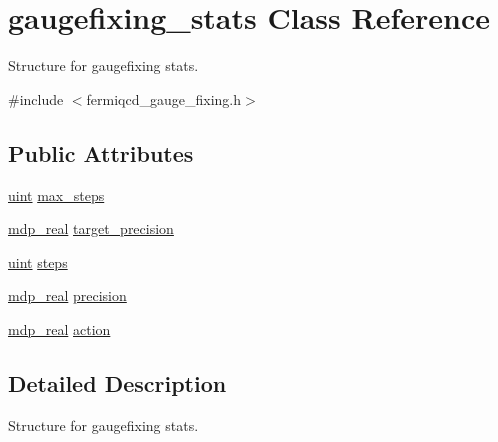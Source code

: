 \hypertarget{classgaugefixing__stats}{
\section{gaugefixing\_\-stats Class Reference}
\label{classgaugefixing__stats}
}


Structure for gaugefixing stats.  


{\ttfamily \#include $<$fermiqcd\_\-gauge\_\-fixing.h$>$}\subsection*{Public Attributes}
\begin{DoxyCompactItemize}
\item 
\hyperlink{mdp__global__vars_8h_a91ad9478d81a7aaf2593e8d9c3d06a14}{uint} \hyperlink{classgaugefixing__stats_a7d7be24b966c51d9bf934d618f300758}{max\_\-steps}
\item 
\hyperlink{mdp__global__vars_8h_a049e4c1d4e74d644878a42f9909463e4}{mdp\_\-real} \hyperlink{classgaugefixing__stats_a61c415b209b1c6a150b768b809ca4d08}{target\_\-precision}
\item 
\hyperlink{mdp__global__vars_8h_a91ad9478d81a7aaf2593e8d9c3d06a14}{uint} \hyperlink{classgaugefixing__stats_a92e80b6818b14886ea28265003917acc}{steps}
\item 
\hyperlink{mdp__global__vars_8h_a049e4c1d4e74d644878a42f9909463e4}{mdp\_\-real} \hyperlink{classgaugefixing__stats_a3262e3d6041404f63ae6ce34a9fef341}{precision}
\item 
\hyperlink{mdp__global__vars_8h_a049e4c1d4e74d644878a42f9909463e4}{mdp\_\-real} \hyperlink{classgaugefixing__stats_a3804badb47666b7081af146aa669d2f3}{action}
\end{DoxyCompactItemize}


\subsection{Detailed Description}
Structure for gaugefixing stats. 

